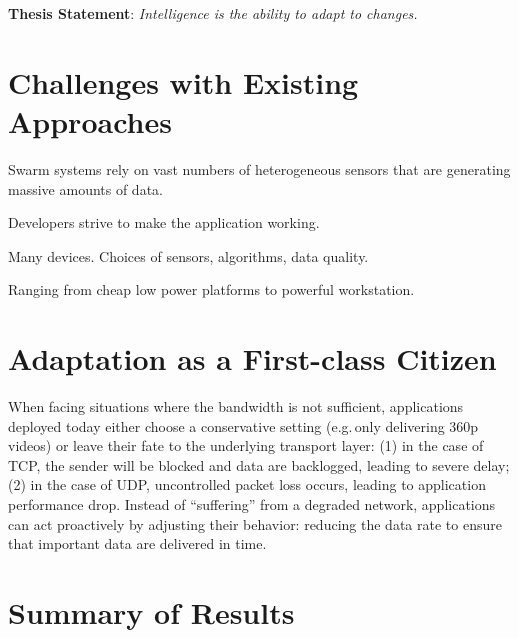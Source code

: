 \documentclass[thesis.tex]{subfiles}
\begin{document}
\vspace{1em}

\noindent\textbf{Thesis Statement}: \textit{Intelligence is the ability to adapt to
  changes.}

\vspace{1em}

\section{Challenges with Existing Approaches}
\label{sec:chall-with-exist}

 Swarm systems rely on vast numbers of heterogeneous
sensors that are generating massive amounts of data.

 Developers strive to make the application working.

 Many devices. Choices of sensors, algorithms, data
quality.

 Ranging from cheap low power platforms to
powerful workstation.

\section{Adaptation as a First-class Citizen}
\label{sec:adaptation}

When facing situations where the bandwidth is not sufficient, applications
deployed today either choose a conservative setting (e.g.\,only delivering 360p
videos) or leave their fate to the underlying transport layer: (1) in the case
of TCP, the sender will be blocked and data are backlogged, leading to severe
delay; (2) in the case of UDP, uncontrolled packet loss occurs, leading to
application performance drop. Instead of ``suffering'' from a degraded network,
applications can act proactively by adjusting their behavior: reducing the data
rate to ensure that important data are delivered in time.




\section{Summary of Results}
\label{sec:summary-results-1}
\end{document}

